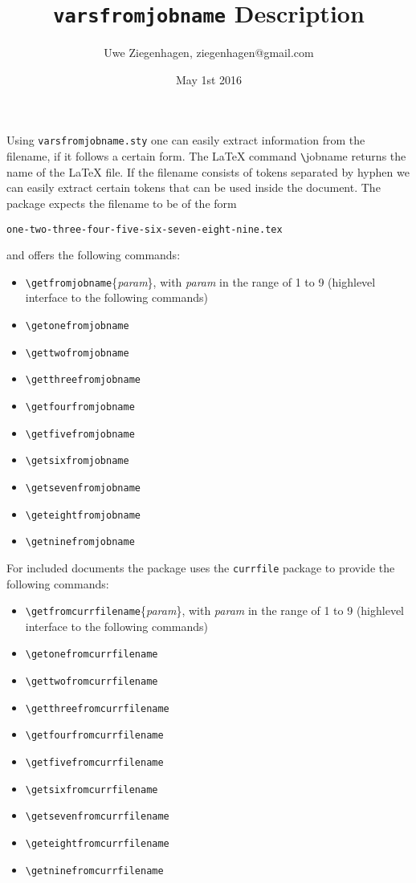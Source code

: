 \documentclass{article}
\date{May 1st 2016}
\author{Uwe Ziegenhagen, ziegenhagen@gmail.com}
\title{\texttt{varsfromjobname} Description}
\begin{document}
\maketitle

\noindent Using \texttt{varsfromjobname.sty} one can easily extract information from the filename, if it follows a certain form. The LaTeX command \verb|\|jobname returns the name of the LaTeX file. If the filename consists of tokens separated by hyphen we can easily extract certain tokens that can be used inside the document. The package expects the filename to be of the form 

\noindent\texttt{one-two-three-four-five-six-seven-eight-nine.tex} 

\noindent and offers the following commands:

\begin{itemize}
	\item \verb|\getfromjobname|\{\textit{param}\}, with \textit{param} in the
	 range of 1 to 9 (highlevel interface to the following commands)
	\item \verb|\getonefromjobname|
	\item \verb|\gettwofromjobname|
	\item \verb|\getthreefromjobname|
	\item \verb|\getfourfromjobname|
	\item \verb|\getfivefromjobname|
	\item \verb|\getsixfromjobname|
	\item \verb|\getsevenfromjobname|
	\item \verb|\geteightfromjobname|
	\item \verb|\getninefromjobname|	
\end{itemize}

For included documents the package uses the \texttt{currfile} package to provide the following commands: 

\begin{itemize}
	\item \verb|\getfromcurrfilename|\{\textit{param}\}, with \textit{param} in the
	 range of 1 to 9 (highlevel interface to the following commands)
	\item \verb|\getonefromcurrfilename|
	\item \verb|\gettwofromcurrfilename|
	\item \verb|\getthreefromcurrfilename|
	\item \verb|\getfourfromcurrfilename|
	\item \verb|\getfivefromcurrfilename|
	\item \verb|\getsixfromcurrfilename|
	\item \verb|\getsevenfromcurrfilename|
	\item \verb|\geteightfromcurrfilename|
	\item \verb|\getninefromcurrfilename|	
\end{itemize}
\end{document}
